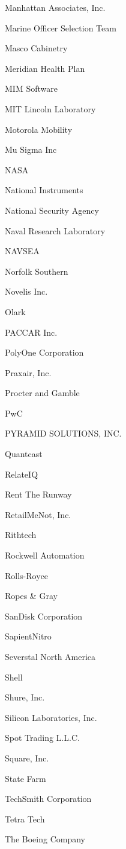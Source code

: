 \documentclass[twoside]{article}
\begin{document}
\begin{center}
\begin{multicols}{5}
\begin{FlushLeft}
\begin{compactitem}
\item Manhattan Associates, Inc.
\item Marine Officer Selection Team
\item Masco Cabinetry
\item Meridian Health Plan
\item MIM Software
\item MIT Lincoln Laboratory
\item Motorola Mobility
\item Mu Sigma Inc
\item NASA
\item National Instruments
\item National Security Agency
\item Naval Research Laboratory
\item NAVSEA
\item Norfolk Southern
\item Novelis Inc.
\item Olark
\item PACCAR Inc.
\item PolyOne Corporation
\item Praxair, Inc.
\item Procter and Gamble
\item PwC
\item PYRAMID SOLUTIONS, INC.
\item Quantcast
\item RelateIQ
\item Rent The Runway
\item RetailMeNot, Inc.
\item Rithtech
\item Rockwell Automation
\item Rolls-Royce
\item Ropes \& Gray
\item SanDisk Corporation
\item SapientNitro
\item Severstal North America
\item Shell
\item Shure, Inc.
\item Silicon Laboratories, Inc.
\item Spot Trading L.L.C.
\item Square, Inc.
\item State Farm
\item TechSmith Corporation
\item Tetra Tech
\item The Boeing Company

\end{compactitem}
\end{FlushLeft}
\end{multicols}
\end{center}
\end{document}
